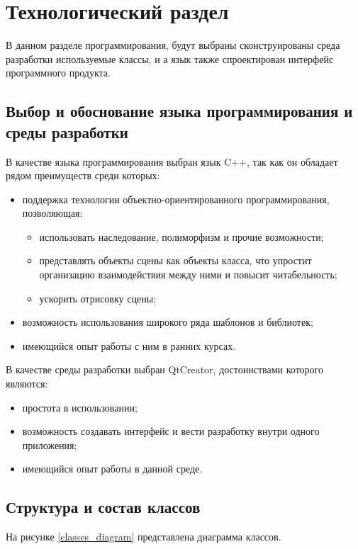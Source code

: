 \chapter{Технологический раздел}

В данном разделе программирования, будут выбраны сконструированы среда разработки используемые классы, и а язык также спроектирован интерфейс программного продукта.

\section{Выбор и обоснование языка программирования и среды разработки}

В качестве языка программирования выбран язык C++, так как он обладает рядом преимуществ среди которых:
\begin{itemize}
	\item поддержка технологии объектно-ориентированного программирования, позволяющая:
	\begin{itemize}
		\item использовать наследование, полиморфизм и прочие возможности;
		\item представлять объекты сцены как объекты класса, что упростит организацию взаимодействия между ними и повысит читабельность;
		\item ускорить отрисовку сцены;
	\end{itemize}
	\item возможность использования широкого ряда шаблонов и библиотек;
	\item имеющийся опыт работы с ним в ранних курсах.
\end{itemize}

В качестве среды разработки выбран QtCreator, достоинствами которого являются:
\begin{itemize}
	\item простота в использовании;
	\item возможность создавать интерфейс и вести разработку внутри одного приложения;
	\item имеющийся опыт работы в данной среде.
\end{itemize}

\section{Структура и состав классов}

На рисунке \ref{classes_diagram} представлена диаграмма классов.

